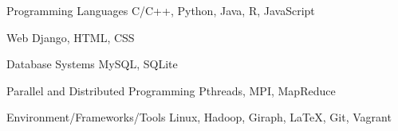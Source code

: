 

\begin{cvskills}

  \cvskill
    {Programming Languages} %
    {C/C++, Python, Java, R, JavaScript} %

  \cvskill
    {Web} %
    {Django, HTML, CSS} %

  \cvskill
    {Database Systems} %
    {MySQL, SQLite} %

  \cvskill
    {Parallel and Distributed Programming} %
    {Pthreads, MPI, MapReduce} %

  \cvskill
    {Environment/Frameworks/Tools} %
    {Linux, Hadoop, Giraph, \LaTeX, Git, Vagrant} %

\end{cvskills}
